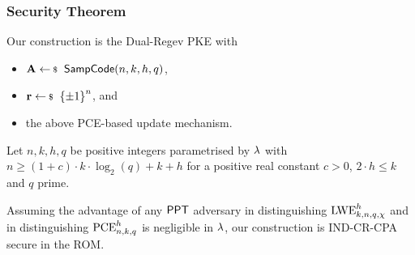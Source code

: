 \documentclass[xcolor=table,10pt,aspectratio=169]{beamer}
\begin{document}
\begin{frame}
  \frametitle{Security Theorem}

  Our construction is the Dual-Regev PKE with
  \begin{itemize}[label=\textbullet]
    \item \(\mat{A} \sample \SampleCode(n,k,h,q)\),
    \item \(\vec{r} \sample \set{\pm 1}^n\), and
    \item the above PCE-based update mechanism.
  \end{itemize}

  \begin{theorem}
    Let \(n, k, h, q\) be positive integers parametrised by \(\lambda\) with \(n \geq (1 + c) \cdot k \cdot \log_2(q) + k + h\) for a positive real constant \(c>0\), \(2 \cdot h \leq k\) and \(q\) prime.

    Assuming the advantage of any \(\mathsf{PPT}\) adversary in distinguishing \(\text{LWE}_{k,n,q,\chi}^h\) and in distinguishing \(\text{PCE}_{n,k,q}^h\) is negligible in \(\lambda\), our construction is IND-CR-CPA secure in the ROM.
  \end{theorem}

\end{frame}
\end{document}
